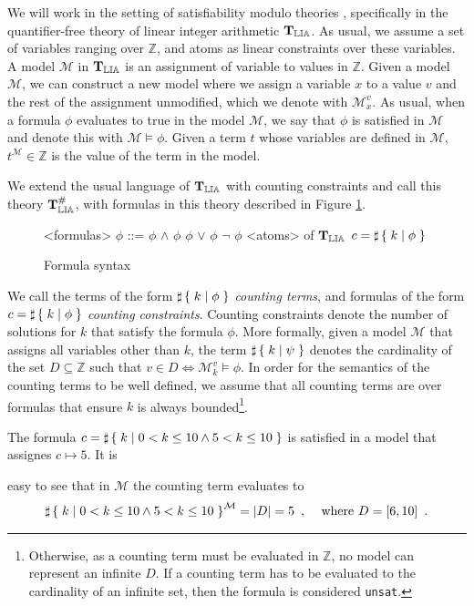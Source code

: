 
We will work in the setting of satisfiability modulo theories
\cite{barrett2009satisfiability}, specifically in the quantifier-free
theory of linear integer arithmetic $\operatorname{\mathbf{T}_{\mathbb{LIA}}}$. As usual, we assume a
set of variables ranging over $\mathbb{Z}$, and atoms as linear
constraints over these variables. A model $\mathcal{M}$ in $\operatorname{\mathbf{T}_{\mathbb{LIA}}}$ is
an assignment of variable to values in $\mathbb{Z}$. Given a model
$\mathcal{M}$, we can construct a new model where we assign a variable
$x$ to a value $v$ and the rest of the assignment unmodified, which we
denote with $\mathcal{M}^v_x$. As usual, when a formula $\phi$
evaluates to true in the model $\mathcal{M}$, we say that $\phi$ is
satisfied in $\mathcal{M}$ and denote this with $\mathcal{M} \vDash
\phi$. Given a term $t$ whose variables are defined in $\mathcal{M}$,
$t^\mathcal{M} \in \mathbb{Z}$ is the value of the term in the model.

We extend the usual language of $\operatorname{\mathbf{T}_{\mathbb{LIA}}}$ with counting constraints and
call this theory $\operatorname{\mathbf{T}^\#_{\mathbb{LIA}}}$, with formulas in this theory described in
Figure \ref{formula}.

\begin{figure}[h]
\begin{grammar}
<formulas> $\phi$ ::= $\phi$ $\land$ $\phi$
\alt $\phi$ $\lor$ $\phi$
\alt $\lnot$ $\phi$
\alt <atoms> of $\operatorname{\mathbf{T}_{\mathbb{LIA}}}$
\alt $c = \sharp\left\lbrace\;k\;|\;\phi\;\right\rbrace$
\end{grammar}

\caption{Formula syntax}
\label{formula}
\end{figure}

We call the terms of the form $\sharp\left\lbrace\;k\;|\;\phi\;\right\rbrace$ \emph{counting
terms}, and formulas of the form $c = \sharp\left\lbrace\;k\;|\;\phi\;\right\rbrace$
\emph{counting constraints}. 
Counting constraints denote the number of solutions for $k$
that satisfy the formula $\phi$.
More formally, given a model $\mathcal{M}$ that
assigns all variables other than $k$, the term $\sharp\left\lbrace\;k\;|\;\psi\;\right\rbrace$
denotes the cardinality of the set $D \subseteq \mathbb{Z}$ such that
$v \in D \iff \mathcal{M}^v_k \vDash \phi$. In order for the semantics
of the counting terms to be well defined, we assume that all counting
terms are over formulas that ensure $k$ is always bounded\footnote{Otherwise, as a counting term must be evaluated in $\mathbb{Z}$, no model can represent an infinite $D$. If a counting term has to be evaluated to the cardinality of an infinite set, then the formula is considered \texttt{unsat}.}.

\begin{example}
\label{ex:semantics}
The formula $c = \sharp\left\lbrace\;k\;|\;0 < k \le 10 \land 5 < k \le 10\;\right\rbrace$ is
satisfied in a model that assignes $c \mapsto 5$. It is

easy to see that in $\mathcal{M}$ the counting term evaluates to
\begin{align*}
  \sharp\left\lbrace\;k\;|\;0 < k \le 10 \land 5 < k \le 10\;\right\rbrace^\mathcal{M} = |D| = 5\enspace, &&
  \text{ where } D = [6, 10]\enspace.
\end{align*}

\end{example}

